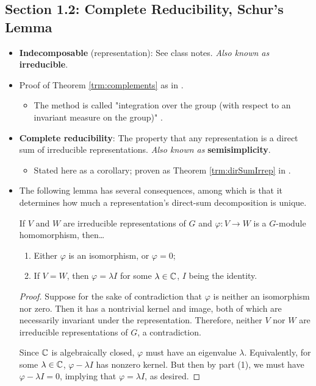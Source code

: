 \documentclass[../notes.tex]{subfiles}
\begin{document}
\subsection*{Section 1.2: Complete Reducibility, Schur's Lemma}
\begin{itemize}
    \item \textbf{Indecomposable} (representation): See class notes. \emph{Also known as} \textbf{irreducible}.
    \item Proof of Theorem \ref{trm:complements} as in \textcite{bib:Serre}.
    \begin{itemize}
        \item The method is called "integration over the group (with respect to an invariant measure on the group)" \parencite[6]{bib:FultonHarris}.
    \end{itemize}
    \item \textbf{Complete reducibility}: The property that any representation is a direct sum of irreducible representations. \emph{Also known as} \textbf{semisimplicity}.
    \begin{itemize}
        \item Stated here as a corollary; proven as Theorem \ref{trm:dirSumIrrep} in \textcite{bib:Serre}.
    \end{itemize}
    \item The following lemma has several consequences, among which is that it determines how much a representation's direct-sum decomposition is unique.
    \setcounter{FHchapter}{1}
    \setcounter{FHlemma}{6}
    \begin{FHlemma}\label{lem:Schur}
        If $V$ and $W$ are irreducible representations of $G$ and $\varphi:V\to W$ is a $G$-module homomorphism, then\dots
        \begin{enumerate}
            \item Either $\varphi$ is an isomorphism, or $\varphi=0$;
            \item If $V=W$, then $\varphi=\lambda I$ for some $\lambda\in\mathbb{C}$, $I$ being the identity.
        \end{enumerate}
        \begin{proof}
            Suppose for the sake of contradiction that $\varphi$ is neither an isomorphism nor zero. Then it has a nontrivial kernel and image, both of which are necessarily invariant under the representation. Therefore, neither $V$ nor $W$ are irreducible representations of $G$, a contradiction.\par
            Since $\mathbb{C}$ is algebraically closed, $\varphi$ must have an eigenvalue $\lambda$. Equivalently, for some $\lambda\in\mathbb{C}$, $\varphi-\lambda I$ has nonzero kernel. But then by part (1), we must have $\varphi-\lambda I=0$, implying that $\varphi=\lambda I$, as desired.

\end{proof}
\end{FHlemma}
\end{itemize}
\end{document}

